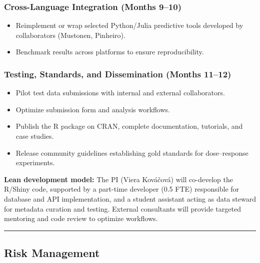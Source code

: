 \documentclass[
  letterpaper,
  DIV=11,
  numbers=noendperiod]{scrartcl}
\providecommand{\tightlist}{%
  \setlength{\itemsep}{0pt}\setlength{\parskip}{0pt}}
\begin{document}
\subsubsection{Cross-Language Integration (Months
9--10)}\label{cross-language-integration-months-910}

\begin{itemize}
\tightlist
\item
  Reimplement or wrap selected Python/Julia predictive tools developed
  by collaborators (Mustonen, Pinheiro).
\item
  Benchmark results across platforms to ensure reproducibility.
\end{itemize}

\subsubsection{Testing, Standards, and Dissemination (Months
11--12)}\label{testing-standards-and-dissemination-months-1112}

\begin{itemize}
\tightlist
\item
  Pilot test data submissions with internal and external collaborators.
\item
  Optimize submission form and analysis workflows.
\item
  Publish the R package on CRAN, complete documentation, tutorials, and
  case studies.
\item
  Release community guidelines establishing gold standards for
  dose--response experiments.
\end{itemize}

\textbf{Lean development model:} The PI (Viera Kováčová) will co-develop
the R/Shiny code, supported by a part-time developer (0.5 FTE)
responsible for database and API implementation, and a student assistant
acting as data steward for metadata curation and testing. External
consultants will provide targeted mentoring and code review to optimize
workflows.

\begin{center}\rule{0.5\linewidth}{0.5pt}\end{center}

\subsection{Risk Management}\label{risk-management}
\end{document}
